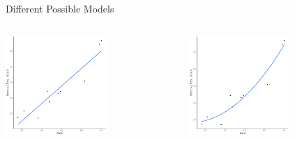 \documentclass{beamer}\usepackage[]{graphicx}\usepackage[]{color}
\newenvironment{knitrout}{}{} %
\begin{document}

\begin{frame}{Different Possible Models}
  
  \begin{columns}
    \begin{column}{0.5\textwidth}
        
\begin{knitrout}\footnotesize
{}\color{fgcolor}

{\centering \includegraphics[width=0.6\textwidth]{figure/unnamed-chunk-10-1} 

}



\end{knitrout}

\end{column}

\begin{column}{0.5\textwidth}
  
\begin{knitrout}\footnotesize
{}\color{fgcolor}

{\centering \includegraphics[width=0.6\textwidth]{figure/unnamed-chunk-11-1} 

}
\end{knitrout}
\end{column}
\end{columns}
\end{frame}
\end{document}
